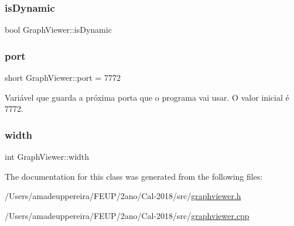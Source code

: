 \mbox{\label{class_graph_viewer_a9d9947154bc63354c6d02a0680aad952}} 
\subsubsection{\texorpdfstring{is\+Dynamic}{isDynamic}}
{\footnotesize\ttfamily bool Graph\+Viewer\+::is\+Dynamic\hspace{0.3cm}{\ttfamily [private]}}

\mbox{\label{class_graph_viewer_a89d0abe75f41feededc49497cc514342}} 
\subsubsection{\texorpdfstring{port}{port}}
{\footnotesize\ttfamily short Graph\+Viewer\+::port = 7772\hspace{0.3cm}{\ttfamily [static]}}

Variável que guarda a próxima porta que o programa vai usar. O valor inicial é 7772. \mbox{\label{class_graph_viewer_a5de27a1d20968b8494cd4bf5a4eb27e1}} 
\subsubsection{\texorpdfstring{width}{width}}
{\footnotesize\ttfamily int Graph\+Viewer\+::width\hspace{0.3cm}{\ttfamily [private]}}



The documentation for this class was generated from the following files\+:\begin{DoxyCompactItemize}
\item 
/\+Users/amadeuppereira/\+F\+E\+U\+P/2ano/\+Cal-\/2018/src/\mbox{\hyperlink{graphviewer_8h}{graphviewer.\+h}}\item 
/\+Users/amadeuppereira/\+F\+E\+U\+P/2ano/\+Cal-\/2018/src/\mbox{\hyperlink{graphviewer_8cpp}{graphviewer.\+cpp}}\end{DoxyCompactItemize}
